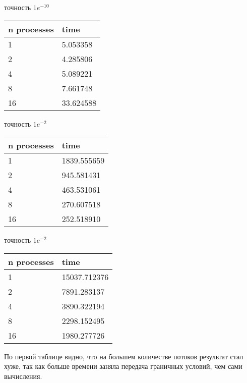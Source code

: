 \documentclass[12pt]{article}
\begin{document}
\begin{table*}[!ht]
	\begin{minipage}{.49\linewidth}
		\centering
		\caption*{Область 8x8x8}
		точность $1e^{-10}$
		\begin{tabularx}{\linewidth}{|X|X|}
			\hline
			n processes & time      \\
			\hline
			1           & 5.053358  \\
			2           & 4.285806  \\
			4           & 5.089221  \\
			8           & 7.661748  \\
			16          & 33.624588 \\
			\hline
		\end{tabularx}
	\end{minipage}%
	\begin{minipage}{.49\linewidth}
		\centering
		\caption*{Область 64x64x64}
		точность $1e^{-2}$
		\begin{tabularx}{\linewidth}{|X|X|}
			\hline
			n processes & time        \\
			\hline
			1           & 1839.555659 \\
			2           & 945.581431  \\
			4           & 463.531061  \\
			8           & 270.607518  \\
			16          & 252.518910  \\
			\hline
		\end{tabularx}
	\end{minipage}

	\begin{minipage}{.49\linewidth}
		\centering
		\caption*{Область 128x128x128}
		точность $1e^{-2}$
		\begin{tabularx}{\linewidth}{|X|X|}
			\hline
			n processes & time         \\
			\hline
			1           & 15037.712376 \\
			2           & 7891.283137  \\
			4           & 3890.322194  \\
			8           & 2298.152495  \\
			16          & 1980.277726  \\
			\hline
		\end{tabularx}
	\end{minipage}%
\end{table*}

По первой таблице видно, что на большем количестве потоков результат стал хуже,
так как больше времени заняла передача граничных условий, чем сами вычисления.
\end{document}
